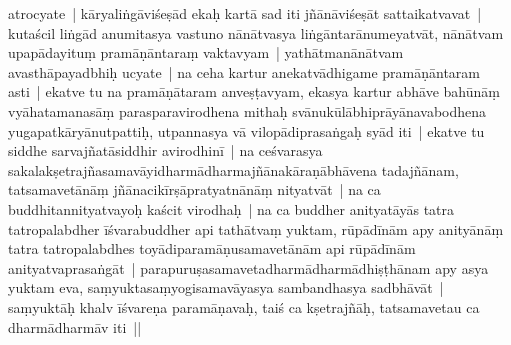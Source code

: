 \documentclass[article,12pt,a4paper]{memoir}
\begin{document}
	  \pstart atrocyate | \label{ratnakīrtinibandhāvali__36r1NSAQKYMBR7UQH8UZ9ZCFB5G}kāryaliṅgāviśeṣād ekaḥ kartā \label{ratnakīrtinibandhāvali__36r1NSAS7AJHGG1XWSGMMV9343A}sad iti jñānāviśeṣāt sattaikatvavat | kutaścil liṅgād anumitasya vastuno nānātvasya liṅgāntarānumeyatvāt, nānātvam upapādayituṃ pramāṇāntaraṃ vaktavyam | yathātmanānātvam avasthāpayadbhiḥ  ucyate | na ceha kartur anekatvādhigame pramāṇāntaram asti | \label{ratnakīrtinibandhāvali__36r1NSAZCVOOMC2YM2ZB4UM8USC}ekatve tu na pramāṇātaram anveṣṭavyam, ekasya kartur abhāve \label{ratnakīrtinibandhāvali__36r1NMMCGE4QHCX673V3O13PAR2}bahūnāṃ vyāhatamanasāṃ  parasparavirodhena mithaḥ svānukūlābhiprāyānavabodhena yugapatkāryānutpattiḥ, utpannasya vā vilopādiprasaṅgaḥ syād\label{ratnakīrtinibandhāvali__36r1NMMCGE62YQPZ3MBLV5PA87V} iti | ekatve tu siddhe sarvajñatāsiddhir avirodhinī | na ceśvarasya sakalakṣetrajñasamavāyidharmādharmajñānakāraṇābhāvena tadajñānam, tatsamavetānāṃ jñānacikīrṣāpratyatnānāṃ nityatvāt | na ca buddhitannityatvayoḥ kaścit virodhaḥ | na ca buddher anityatāyās tatra tatropalabdher īśvarabuddher api tathātvaṃ yuktam, rūpādīnām apy anityānāṃ tatra tatropalabdhes toyādiparamāṇusamavetānām api rūpādīnām anityatvaprasaṅgāt | parapuruṣasamavetadharmādharmādhiṣṭhānam apy asya yuktam eva, saṃyuktasaṃyogisamavāyasya sambandhasya sadbhāvāt | saṃyuktāḥ khalv īśvareṇa paramāṇavaḥ, taiś ca kṣetrajñāḥ, tatsamavetau ca dharmādharmāv iti ||
	\pend
      
\end{document}

